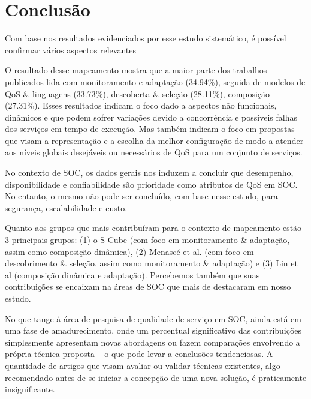 \section{Conclus\~{a}o}\label{sec:conclusao}

Com base nos resultados evidenciados por esse estudo sistem\'{a}tico, \'{e} poss\'{i}vel confirmar v\'{a}rios aspectos relevantes 

O resultado desse mapeamento mostra que a maior parte dos trabalhos publicados lida com monitoramento e adapta\c{c}\~{a}o (34.94\%), seguida de modelos de QoS \& linguagens (33.73\%), descoberta \& sele\c{c}\~{a}o (28.11\%), composi\c{c}\~{a}o (27.31\%). Esses resultados indicam o foco dado a aspectos n\~{a}o funcionais, din\^{a}micos e que podem sofrer varia\c{c}\~{o}es devido a concorrência e possíveis falhas dos servi\c{c}os em tempo de execu\c{c}\~{a}o. Mas tamb\'{e}m indicam o foco em propostas que visam a representa\c{c}\~{a}o e a escolha da melhor configura\c{c}\~{a}o de modo a atender aos níveis globais desej\'{a}veis ou necess\'{a}rios de QoS para um conjunto de servi\c{c}os.

No contexto de SOC, os dados gerais nos induzem a concluir que desempenho, disponibilidade e confiabilidade s\~{a}o prioridade como atributos de QoS em SOC. No entanto, o mesmo n\~{a}o pode ser concluído, com base nesse estudo, para seguran\c{c}a, escalabilidade e custo.

Quanto aos grupos que mais contribu\'{i}ram para o contexto de mapeamento est\~{a}o 3 principais grupos: (1) o S-Cube (com foco em monitoramento \& adapta\c{c}\~{a}o, assim como composi\c{c}\~{a}o din\^{a}mica), (2) Menasc\'{e} et al. (com foco em descobrimento \& sele\c{c}\~{a}o, assim como monitoramento \& adapta\c{c}\~{a}o) e (3) Lin et al (composi\c{c}\~{a}o din\^{a}mica e adapta\c{c}\~{a}o). Percebemos tamb\'{e}m que suas contribui\c{c}\~{o}es se encaixam na \'{a}reas de SOC que mais de destacaram em nosso estudo. 

No que tange \`{a} \'{a}rea de pesquisa de qualidade de servi\c{c}o em SOC, ainda est\'{a} em uma fase de amadurecimento, onde um percentual significativo das contribui\c{c}\~{o}es simplesmente apresentam novas abordagens ou fazem compara\c{c}\~{o}es envolvendo a própria t\'{e}cnica proposta -- o que pode levar a conclus\~{o}es tendenciosas. A quantidade de artigos que visam avaliar ou validar t\'{e}cnicas existentes, algo recomendado antes de se iniciar a concep\c{c}\~{a}o de uma nova solu\c{c}\~{a}o, \'{e} praticamente insignificante.
